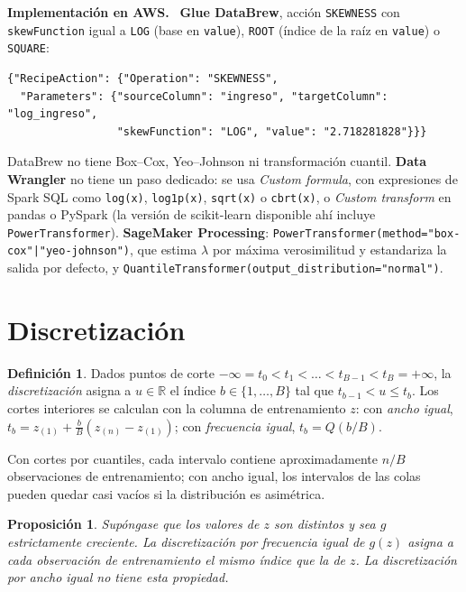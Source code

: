 \documentclass[11pt,a4paper]{article}
\theoremstyle{plain}
\newtheorem{proposicion}[teorema]{Proposición}
\theoremstyle{definition}
\newtheorem{definicion}[teorema]{Definición}
\theoremstyle{remark}
\newcommand{\R}{\mathbb{R}}
\newcommand{\1}{\mathbf{1}}
\newenvironment{aws}{\par\medskip\sloppy\noindent\textbf{Implementación en AWS.}\ }{\par\medskip}
\begin{document}
\begin{aws}
\textbf{Glue DataBrew}, acción \texttt{SKEWNESS} con \texttt{skewFunction}
igual a \texttt{LOG} (base en \texttt{value}), \texttt{ROOT} (índice de la
raíz en \texttt{value}) o \texttt{SQUARE}:
\begin{lstlisting}
{"RecipeAction": {"Operation": "SKEWNESS",
  "Parameters": {"sourceColumn": "ingreso", "targetColumn": "log_ingreso",
                 "skewFunction": "LOG", "value": "2.718281828"}}}
\end{lstlisting}
DataBrew no tiene Box--Cox, Yeo--Johnson ni transformación cuantil.
\textbf{Data Wrangler} no tiene un paso dedicado: se usa \emph{Custom
formula}, con expresiones de Spark SQL como \texttt{log(x)},
\texttt{log1p(x)}, \texttt{sqrt(x)} o \texttt{cbrt(x)}, o \emph{Custom
transform} en pandas o PySpark (la versión de scikit-learn disponible ahí
incluye \texttt{PowerTransformer}). \textbf{SageMaker Processing}:
\texttt{PowerTransformer(method="box-cox"|"yeo-johnson")}, que estima
$\lambda$ por máxima verosimilitud y estandariza la salida por defecto, y
\texttt{QuantileTransformer(output\_distribution="normal")}.
\end{aws}

\section{Discretización}\label{sec:discretizacion}

\begin{definicion}
Dados puntos de corte $-\infty=t_0<t_1<\dots<t_{B-1}<t_B=+\infty$, la
\emph{discretización} asigna a $u\in\R$ el índice $b\in\{1,\dots,B\}$ tal
que $t_{b-1}<u\le t_b$. Los cortes interiores se calculan con la columna
de entrenamiento $z$: con \emph{ancho igual},
$t_b=z_{(1)}+\frac bB(z_{(n)}-z_{(1)})$; con \emph{frecuencia igual},
$t_b=Q(b/B)$.
\end{definicion}

Con cortes por cuantiles, cada intervalo contiene aproximadamente $n/B$
observaciones de entrenamiento; con ancho igual, los intervalos de las
colas pueden quedar casi vacíos si la distribución es asimétrica.

\begin{proposicion}\label{prop:bin-cuantil}
Supóngase que los valores de $z$ son distintos y sea $g$ estrictamente
creciente. La discretización por frecuencia igual de $g(z)$ asigna a cada
observación de entrenamiento el mismo índice que la de $z$. La
discretización por ancho igual no tiene esta propiedad.
\end{proposicion}
\end{document}
